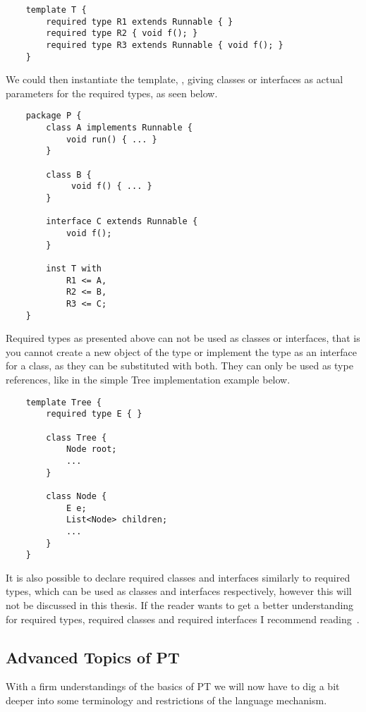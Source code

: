 \begin{verbatim}
    template T {
        required type R1 extends Runnable { }
        required type R2 { void f(); }
        required type R3 extends Runnable { void f(); }
    }
\end{verbatim}

We could then instantiate the template, , giving classes or interfaces as actual parameters for the required types, as seen below.

\begin{verbatim}
    package P {
        class A implements Runnable {
            void run() { ... }
        }

        class B {
             void f() { ... }
        }

        interface C extends Runnable {
            void f();
        }

        inst T with
            R1 <= A,
            R2 <= B,
            R3 <= C;
    }
\end{verbatim}

Required types as presented above can not be used as classes or interfaces, that is you cannot create a new object of the type or implement the type as an interface for a class, as they can be substituted with both.
They can only be used as type references, like in the simple Tree implementation example below.

\begin{verbatim}
    template Tree {
        required type E { }

        class Tree {
            Node root;
            ...
        }

        class Node {
            E e;
            List<Node> children;
            ...
        }
    }
\end{verbatim}

It is also possible to declare required classes and interfaces similarly to required types, which can be used as classes and interfaces respectively, however this will not be discussed in this thesis.
If the reader wants to get a better understanding for required types, required classes and required interfaces I recommend reading~\cite{requiredtypes}.

\subsection{Advanced Topics of PT}\label{subsec:advanced-topics-of-pt}

With a firm understandings of the basics of PT we will now have to dig a bit deeper into some terminology and restrictions of the language mechanism.


